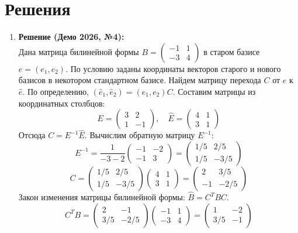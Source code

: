 \section*{Решения}

\begin{enumerate}

    \item \textbf{Решение (Демо 2026, №4):}\\
    Дана матрица билинейной формы $B = \begin{pmatrix} -1 & 1 \\ -3 & 4 \end{pmatrix}$ в старом базисе $e = (e_1, e_2)$.
    По условию заданы координаты векторов старого и нового базисов в некотором стандартном базисе. Найдем матрицу перехода $C$ от $e$ к $\hat{e}$.
    По определению, $(\hat{e}_1, \hat{e}_2) = (e_1, e_2) C$. Составим матрицы из координатных столбцов:
    $$E = \begin{pmatrix} 3 & 2 \\ 1 & -1 \end{pmatrix}, \quad \hat{E} = \begin{pmatrix} 4 & 1 \\ 3 & 1 \end{pmatrix}$$
    Отсюда $C = E^{-1} \hat{E}$. Вычислим обратную матрицу $E^{-1}$:
    $$E^{-1} = \frac{1}{-3 - 2} \begin{pmatrix} -1 & -2 \\ -1 & 3 \end{pmatrix} = \begin{pmatrix} 1/5 & 2/5 \\ 1/5 & -3/5 \end{pmatrix}$$
    $$C = \begin{pmatrix} 1/5 & 2/5 \\ 1/5 & -3/5 \end{pmatrix} \begin{pmatrix} 4 & 1 \\ 3 & 1 \end{pmatrix} = \begin{pmatrix} 2 & 3/5 \\ -1 & -2/5 \end{pmatrix}$$
    Закон изменения матрицы билинейной формы: $\hat{B} = C^T B C$.
    $$C^T B = \begin{pmatrix} 2 & -1 \\ 3/5 & -2/5 \end{pmatrix} \begin{pmatrix} -1 & 1 \\ -3 & 4 \end{pmatrix} = \begin{pmatrix} 1 & -2 \\ 3/5 & -1 \end{pmatrix}$$

\end{enumerate}
